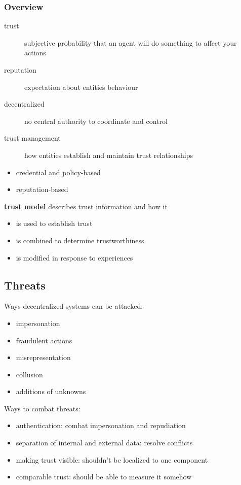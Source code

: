 \documentclass[]{article}
\theoremstyle{definition}
\begin{document}
	\subsubsection{Overview}
	\begin{description}
		\item[trust] subjective probability that an agent will do something to affect your actions
		\item[reputation] expectation about entities behaviour
		\item[decentralized] no central authority to coordinate and control
		\item[trust management] how entities establish and maintain trust relationships
	\end{description}
	\begin{itemize}
		\item credential and policy-based
		\item reputation-based
	\end{itemize}
	\textbf{trust model} describes trust information and how it
	\begin{itemize}
		\item is used to establish trust
		\item is combined to determine trustworthiness
		\item is modified in response to experiences
	\end{itemize}
	\subsection{Threats}
	Ways decentralized systems can be attacked:
	\begin{itemize}
		\item impersonation
		\item fraudulent actions
		\item misrepresentation
		\item collusion 
		\item additions of unknowns
	\end{itemize}
	Ways to combat threats:
	\begin{itemize}
		\item authentication: combat impersonation and repudiation
		\item separation of internal and external data: resolve conflicts
		\item making trust visible: shouldn't be localized to one component
		\item comparable trust: should be able to measure it somehow
	\end{itemize}
\end{document}
